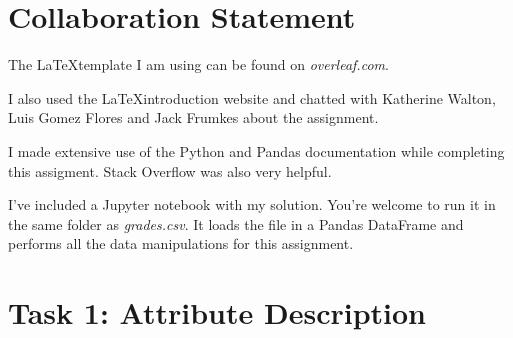 \documentclass[12pt,letterpaper]{article}
\begin{document}
\section*{Collaboration Statement}

The \LaTeX template I am using can be found on \textit{overleaf.com}.

I also used the \LaTeX   introduction website and  chatted with Katherine Walton, Luis Gomez Flores and Jack Frumkes about the assignment.

I made extensive use of the Python and Pandas documentation while completing this assigment. Stack Overflow was also very helpful.

I've included a Jupyter notebook with my solution. You're welcome to run it in the same folder as \textit{grades.csv}. It loads the file in a Pandas DataFrame and performs all the data manipulations for this assignment.

\section*{Task 1: Attribute Description}
\end{document}
